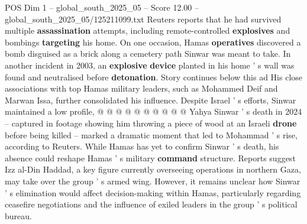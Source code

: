 \begin{textsample}{POS Dim 1 – global\_south\_2025\_05 – Score 12.00 – global\_south\_2025\_05/125211099.txt}
Reuters reports that he had survived multiple \textbf{assassination} attempts, including remote-controlled \textbf{explosives} and bombings \textbf{targeting} his home.
On one occasion, Hamas \textbf{operatives} discovered a bomb disguised as a brick along a cemetery path Sinwar was meant to take.
In another incident in 2003, an \textbf{explosive} \textbf{device} planted in his home ' s wall was found and neutralised before \textbf{detonation}.
Story continues below this ad His close associations with top Hamas military leaders, such as Mohammed Deif and Marwan Issa, further consolidated his influence.
Despite Israel ' s efforts, Sinwar maintained a low profile, @ @ @ @ @ @ @ @ @ @ Yahya Sinwar ' s death in 2024 -- captured in footage showing him throwing a piece of wood at an Israeli \textbf{drone} before being killed -- marked a dramatic moment that led to Mohammad ' s rise, according to Reuters.
While Hamas has yet to confirm Sinwar ' s death, his absence could reshape Hamas ' s military \textbf{command} structure.
Reports suggest Izz al-Din Haddad, a key figure currently overseeing operations in northern Gaza, may take over the group ' s armed wing.
However, it remains unclear how Sinwar ' s elimination would affect decision-making within Hamas, particularly regarding ceasefire negotiations and the influence of exiled leaders in the group ' s political bureau.

\end{textsample}
